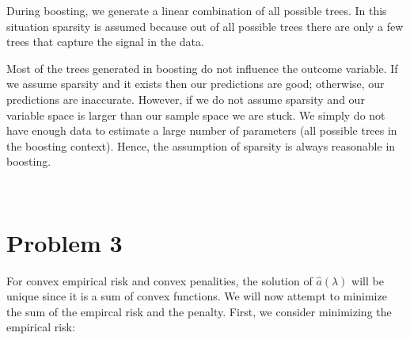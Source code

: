 \documentclass[11pt]{article}
\begin{document}
\vspace{5 mm}
\noindent
During boosting, we generate a linear combination of all possible trees. In 
this situation sparsity is assumed because out of all possible trees there are 
only a few trees that capture the signal in the data. 

\vspace{5 mm}
\noindent
Most of the trees generated in boosting do not influence the outcome variable. 
If we assume sparsity and it exists then our predictions are good; otherwise, 
our predictions are inaccurate. However, if we do not assume sparsity and 
our variable space is larger than our sample space we are stuck. We simply do 
not have enough data to estimate a large number of parameters (all possible 
trees in the boosting context). Hence, the assumption of sparsity is always 
reasonable in boosting.

\newpage
\begin{center}
\ \\
\end{center}

\section*{Problem 3}

\noindent
For convex empirical risk and convex penalities, the solution of 
$\hat{a}(\lambda)$ will be unique since it is a sum of convex functions. We 
will now attempt to minimize the sum of the empircal risk and the penalty. 
First, we consider minimizing the empirical risk:
\end{document}
